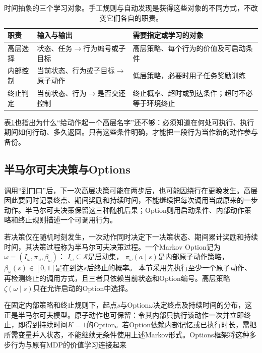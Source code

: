 \begin{table}[t]
  \centering
  \small
  \begin{tabularx}{\linewidth}{>{\raggedright\arraybackslash}p{24mm} >{\raggedright\arraybackslash}X >{\raggedright\arraybackslash}X}
    \toprule
    职责 & 输入与输出 & 需要指定或学习的对象 \\
    \midrule
    高层选择 & 状态、任务$\to$行为编号或子目标 & 高层策略、每个行为的价值及可启动条件 \\
    内部控制 & 当前状态、行为或子目标$\to$原子动作 & 低层策略，必要时用子任务奖励训练 \\
    终止判定 & 当前状态、行为$\to$是否交还控制 & 终止概率、超时或到达条件；超时不必等于环境终止 \\
    \bottomrule
  \end{tabularx}
  \caption{时间抽象的三个学习对象。手工规则与自动发现是获得这些对象的不同方式，不改变它们各自的职责。}
  \label{tab:rl-learning-hierarchy-objects}
\end{table}

表\ref{tab:rl-learning-hierarchy-objects}也指出为什么“给动作起一个高层名字”还不够：必须知道在何处可执行、执行期间如何行动、多久返回。只有这些条件明确，才能把一段行为当作新的动作参与备份。

\subsection{半马尔可夫决策与Options}
\label{sec:rl-learning-options}

调用“到门口”后，下一次高层决策可能在两步后，也可能因绕行在更晚发生。高层因此要同时记录终点、期间奖励和持续时间，不能继续把每次调用当成原来的一步动作。半马尔可夫决策保留这三种随机后果；Option则用启动条件、内部动作策略和终止规则描述一个可调用行为。

\begin{definition}
  \label{def:rl-learning-option}
  若决策仅在随机时刻发生，一次动作同时决定下一决策状态、期间累计奖励和持续时间，其决策过程称为半马尔可夫决策过程。一个Markov Option记为
  $\omega=(I_\omega,\pi_\omega,\beta_\omega)$：
  $I_\omega\subseteq\mathcal S$是启动集，
  $\pi_\omega(a\mid s)$是内部原子动作策略，
  $\beta_\omega(s)\in[0,1]$是在到达$s$后终止的概率。
  本节采用先执行至少一个原子动作、再检测终止的调用方式，且三者只依赖当前状态和Option编号。高层策略$\zeta(\omega\mid s)$只在允许启动的Option中选择。
\end{definition}

在固定内部策略和终止规则下，起点$s$与Option$\omega$决定终点及持续时间的分布，这正是半马尔可夫模型。原子动作也可保留：令其内部只执行该动作一次并立即终止，即得到持续时间$K=1$的Option。若Option依赖内部记忆或已执行时长，需把所需变量并入状态，不能继续无条件使用上述Markov形式。Options框架将这种多步行为与原有MDP的价值学习连接起来


